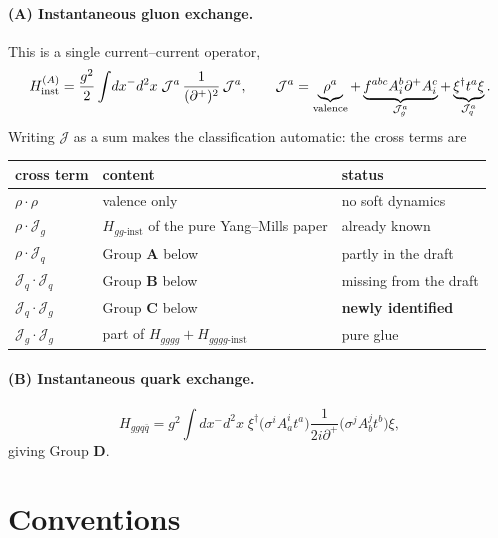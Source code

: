 \documentclass[11pt]{article}
\newcommand{\dg}{\dagger}
\newcommand{\Jc}{\mathcal{J}}
\begin{document}
\paragraph{(A) Instantaneous gluon exchange.} This is a single current--current operator,
\begin{equation}
H^{(A)}_{\rm inst}=\frac{g^{2}}{2}\int\! dx^{-}d^{2}x\;
\Jc^{a}\,\frac{1}{(\partial^{+})^{2}}\,\Jc^{a},
\qquad
\Jc^{a}=\underbrace{\rho^{a}}_{\rm valence}
+\underbrace{f^{abc}A^{b}_{i}\partial^{+}A^{c}_{i}}_{\Jc^{a}_{g}}
+\underbrace{\xi^{\dg}t^{a}\xi}_{\Jc^{a}_{q}} .
\label{eq:HinstA}
\end{equation}
Writing $\Jc$ as a sum makes the classification automatic: the cross terms are
\begin{center}
\renewcommand{\arraystretch}{1.25}
\begin{tabular}{lll}
\hline
cross term & content & status\\
\hline
$\rho\!\cdot\!\rho$ & valence only & no soft dynamics\\
$\rho\!\cdot\!\Jc_{g}$ & $H_{gg\text{-inst}}$ of the pure Yang--Mills paper & already known\\
$\rho\!\cdot\!\Jc_{q}$ & Group \textbf{A} below & partly in the draft\\
$\Jc_{q}\!\cdot\!\Jc_{q}$ & Group \textbf{B} below & missing from the draft\\
$\Jc_{q}\!\cdot\!\Jc_{g}$ & Group \textbf{C} below & \textbf{newly identified}\\
$\Jc_{g}\!\cdot\!\Jc_{g}$ & part of $H_{gggg}+H_{gggg\text{-inst}}$ & pure glue\\
\hline
\end{tabular}
\end{center}

\paragraph{(B) Instantaneous quark exchange.}
\begin{equation}
H_{ggq\bar q}=g^{2}\!\int\! dx^{-}d^{2}x\;
\xi^{\dg}\big(\sigma^{i}A^{i}_{a}t^{a}\big)\frac{1}{2i\partial^{+}}
\big(\sigma^{j}A^{j}_{b}t^{b}\big)\xi ,
\label{eq:Hggqq}
\end{equation}
giving Group \textbf{D}.

\section{Conventions}
\end{document}
